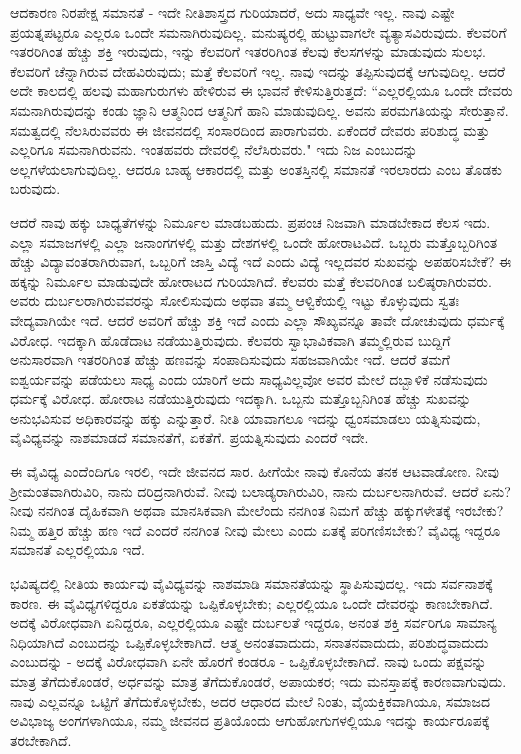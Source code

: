 ಆದಕಾರಣ ನಿರಪೇಕ್ಷ ಸಮಾನತೆ  - ಇದೇ ನೀತಿಶಾಸ್ತ್ರದ ಗುರಿಯಾದರೆ, ಅದು ಸಾಧ್ಯವೇ ಇಲ್ಲ. ನಾವು ಎಷ್ಟೇ ಪ್ರಯತ್ನಪಟ್ಟರೂ ಎಲ್ಲರೂ ಒಂದೇ ಸಮನಾಗಿರುವುದಿಲ್ಲ. ಮನುಷ್ಯರಲ್ಲಿ ಹುಟ್ಟುವಾಗಲೇ ವ್ಯತ್ಯಾಸವಿರುವುದು. ಕೆಲವರಿಗೆ ಇತರರಿಗಿಂತ ಹೆಚ್ಚು ಶಕ್ತಿ ಇರುವುದು, ಇನ್ನು ಕೆಲವರಿಗೆ ಇತರರಿಗಿಂತ ಕೆಲವು ಕೆಲಸಗಳನ್ನು ಮಾಡುವುದು ಸುಲಭ. ಕೆಲವರಿಗೆ ಚೆನ್ನಾಗಿರುವ ದೇಹವಿರುವುದು; ಮತ್ತೆ ಕೆಲವರಿಗೆ ಇಲ್ಲ. ನಾವು ಇದನ್ನು ತಪ್ಪಿಸುವುದಕ್ಕೆ ಆಗುವುದಿಲ್ಲ. ಆದರೆ ಅದೇ ಕಾಲದಲ್ಲಿ ಹಲವು ಮಹಾಗುರುಗಳು ಹೇಳಿರುವ ಈ ಭಾವನೆ ಕೇಳಿಸುತ್ತಿರುತ್ತದೆ: “ಎಲ್ಲರಲ್ಲಿಯೂ ಒಂದೇ ದೇವರು ಸಮನಾಗಿರುವುದನ್ನು ಕಂಡು ಜ್ಞಾನಿ ಆತ್ಮನಿಂದ ಆತ್ಮನಿಗೆ ಹಾನಿ ಮಾಡುವುದಿಲ್ಲ. ಅವನು ಪರಮಗತಿಯನ್ನು ಸೇರುತ್ತಾನೆ. ಸಮತ್ವದಲ್ಲಿ ನೆಲಸಿರುವವರು ಈ ಜೀವನದಲ್ಲಿ ಸಂಸಾರದಿಂದ ಪಾರಾಗುವರು. ಏಕೆಂದರೆ ದೇವರು ಪರಿಶುದ್ಧ ಮತ್ತು ಎಲ್ಲರಿಗೂ ಸಮನಾಗಿರುವನು. ಇಂತಹವರು ದೇವರಲ್ಲಿ ನೆಲೆಸಿರುವರು." ಇದು ನಿಜ ಎಂಬುದನ್ನು ಅಲ್ಲಗಳೆಯಲಾಗುವುದಿಲ್ಲ. ಆದರೂ ಬಾಹ್ಯ ಆಕಾರದಲ್ಲಿ ಮತ್ತು ಅಂತಸ್ತಿನಲ್ಲಿ ಸಮಾನತೆ ಇರಲಾರದು ಎಂಬ ತೊಡಕು ಬರುವುದು.

ಆದರೆ ನಾವು ಹಕ್ಕು ಬಾಧ್ಯತೆಗಳನ್ನು ನಿರ್ಮೂಲ ಮಾಡಬಹುದು. ಪ್ರಪಂಚ ನಿಜವಾಗಿ ಮಾಡಬೇಕಾದ ಕೆಲಸ ಇದು. ಎಲ್ಲಾ ಸಮಾಜಗಳಲ್ಲಿ ಎಲ್ಲಾ ಜನಾಂಗಗಳಲ್ಲಿ ಮತ್ತು ದೇಶಗಳಲ್ಲಿ ಒಂದೇ ಹೋರಾಟವಿದೆ. ಒಬ್ಬರು ಮತ್ತೊಬ್ಬರಿಗಿಂತ ಹೆಚ್ಚು ವಿದ್ಯಾವಂತರಾಗಿರುವಾಗ, ಒಬ್ಬರಿಗೆ ಜಾಸ್ತಿ ವಿದ್ಯೆ ಇದೆ ಎಂದು ವಿದ್ಯೆ ಇಲ್ಲದವರ ಸುಖವನ್ನು ಅಪಹರಿಸಬೇಕೆ? ಈ ಹಕ್ಕನ್ನು ನಿರ್ಮೂಲ ಮಾಡುವುದೇ ಹೋರಾಟದ ಗುರಿಯಾಗಿದೆ. ಕೆಲವರು ಮತ್ತೆ ಕೆಲವರಿಗಿಂತ ಬಲಿಷ್ಠರಾಗಿರುವರು. ಅವರು ದುರ್ಬಲರಾಗಿರುವವರನ್ನು ಸೋಲಿಸುವುದು ಅಥವಾ ತಮ್ಮ ಆಳ್ವಿಕೆಯಲ್ಲಿ ಇಟ್ಟು ಕೊಳ್ಳುವುದು ಸ್ವತಃ ವೇದ್ಯವಾಗಿಯೇ ಇದೆ. ಆದರೆ ಅವರಿಗೆ ಹೆಚ್ಚು ಶಕ್ತಿ ಇದೆ ಎಂದು ಎಲ್ಲಾ ಸೌಖ್ಯವನ್ನೂ ತಾವೇ ದೋಚುವುದು ಧರ್ಮಕ್ಕೆ ವಿರೋಧ. ಇದಕ್ಕಾಗಿ ಹೊಡೆದಾಟ ನಡೆಯುತ್ತಿರುವುದು. ಕೆಲವರು ಸ್ವಾಭಾವಿಕವಾಗಿ ತಮ್ಮಲ್ಲಿರುವ ಬುದ್ದಿಗೆ ಅನುಸಾರವಾಗಿ ಇತರರಿಗಿಂತ ಹೆಚ್ಚು ಹಣವನ್ನು ಸಂಪಾದಿಸುವುದು ಸಹಜವಾಗಿಯೇ ಇದೆ. ಆದರೆ ತಮಗೆ ಐಶ್ವರ್ಯವನ್ನು ಪಡೆಯಲು ಸಾಧ್ಯ ಎಂದು ಯಾರಿಗೆ ಅದು ಸಾಧ್ಯವಿಲ್ಲವೋ ಅವರ ಮೇಲೆ ದಬ್ಬಾಳಿಕೆ ನಡೆಸುವುದು ಧರ್ಮಕ್ಕೆ ವಿರೋಧ. ಹೋರಾಟ ನಡೆಯುತ್ತಿರುವುದು ಇದಕ್ಕಾಗಿ. ಒಬ್ಬನು ಮತ್ತೊಬ್ಬನಿಗಿಂತ ಹೆಚ್ಚು ಸುಖವನ್ನು ಅನುಭವಿಸುವ ಅಧಿಕಾರವನ್ನು ಹಕ್ಕು ಎನ್ನುತ್ತಾರೆ. ನೀತಿ ಯಾವಾಗಲೂ ಇದನ್ನು ಧ್ವಂಸಮಾಡಲು ಯತ್ನಿಸುವುದು, ವೈವಿಧ್ಯವನ್ನು ನಾಶಮಾಡದೆ ಸಮಾನತೆಗೆ, ಏಕತೆಗೆ. ಪ್ರಯತ್ನಿಸುವುದು ಎಂದರೆ ಇದೇ.

ಈ ವೈವಿಧ್ಯ ಎಂದೆಂದಿಗೂ ಇರಲಿ, ಇದೇ ಜೀವನದ ಸಾರ. ಹೀಗೆಯೇ ನಾವು ಕೊನೆಯ ತನಕ ಆಟವಾಡೋಣ. ನೀವು ಶ‍್ರೀಮಂತವಾಗಿರುವಿರಿ, ನಾನು ದರಿದ್ರನಾಗಿರುವೆ. ನೀವು ಬಲಾಡ್ಯರಾಗಿರುವಿರಿ, ನಾನು ದುರ್ಬಲನಾಗಿರುವೆ. ಆದರೆ ಏನು? ನೀವು ನನಗಿಂತ ದೈಹಿಕವಾಗಿ ಅಥವಾ ಮಾನಸಿಕವಾಗಿ ಮೇಲೆಂದು ನನಗಿಂತ ನಿಮಗೆ ಹೆಚ್ಚು ಹಕ್ಕುಗಳೇತಕ್ಕೆ ಇರಬೇಕು? ನಿಮ್ಮ ಹತ್ತಿರ ಹೆಚ್ಚು ಹಣ ಇದೆ ಎಂದರೆ ನನಗಿಂತ ನೀವು ಮೇಲು ಎಂದು ಏತಕ್ಕೆ ಪರಿಗಣಿಸಬೇಕು? ವೈವಿಧ್ಯ ಇದ್ದರೂ ಸಮಾನತೆ ಎಲ್ಲರಲ್ಲಿಯೂ ಇದೆ.

ಭವಿಷ್ಯದಲ್ಲಿ ನೀತಿಯ ಕಾರ್ಯವು ವೈವಿಧ್ಯವನ್ನು ನಾಶಮಾಡಿ ಸಮಾನತೆಯನ್ನು ಸ್ಥಾಪಿಸುವುದಲ್ಲ. ಇದು ಸರ್ವನಾಶಕ್ಕೆ ಕಾರಣ. ಈ ವೈವಿಧ್ಯಗಳಿದ್ದರೂ ಏಕತೆಯನ್ನು ಒಪ್ಪಿಕೊಳ್ಳಬೇಕು; ಎಲ್ಲರಲ್ಲಿಯೂ ಒಂದೇ ದೇವರನ್ನು ಕಾಣಬೇಕಾಗಿದೆ. ಅದಕ್ಕೆ ವಿರೋಧವಾಗಿ ಏನಿದ್ದರೂ, ಎಲ್ಲರಲ್ಲಿಯೂ ಎಷ್ಟೇ ದುರ್ಬಲತೆ ಇದ್ದರೂ, ಅನಂತ ಶಕ್ತಿ ಸರ್ವರಿಗೂ ಸಾಮಾನ್ಯ ನಿಧಿಯಾಗಿದೆ ಎಂಬುದನ್ನು ಒಪ್ಪಿಕೊಳ್ಳಬೇಕಾಗಿದೆ. ಆತ್ಮ ಅನಂತವಾದುದು, ಸನಾತನವಾದುದು, ಪರಿಶುದ್ಧವಾದುದು ಎಂಬುದನ್ನು - ಅದಕ್ಕೆ ವಿರೋಧವಾಗಿ ಏನೇ ಹೊರಗೆ ಕಂಡರೂ - ಒಪ್ಪಿಕೊಳ್ಳಬೇಕಾಗಿದೆ. ನಾವು ಒಂದು ಪಕ್ಷವನ್ನು ಮಾತ್ರ ತೆಗೆದುಕೊಂಡರೆ, ಅರ್ಧವನ್ನು ಮಾತ್ರ ತೆಗೆದುಕೊಂಡರೆ, ಅಪಾಯಕರ; ಇದು ಮನಸ್ತಾಪಕ್ಕೆ ಕಾರಣವಾಗುವುದು. ನಾವು ಎಲ್ಲವನ್ನೂ ಒಟ್ಟಿಗೆ ತೆಗೆದುಕೊಳ್ಳಬೇಕು, ಅದರ ಆಧಾರದ ಮೇಲೆ ನಿಂತು, ವೈಯಕ್ತಿಕವಾಗಿಯೂ, ಸಮಾಜದ ಅವಿಭಾಜ್ಯ ಅಂಗಗಳಾಗಿಯೂ, ನಮ್ಮ ಜೀವನದ ಪ್ರತಿಯೊಂದು ಆಗುಹೋಗುಗಳಲ್ಲಿಯೂ ಇದನ್ನು ಕಾರ್ಯರೂಪಕ್ಕೆ ತರಬೇಕಾಗಿದೆ.

